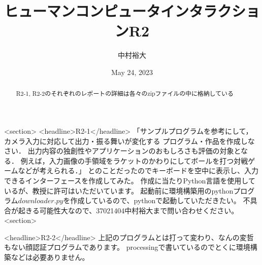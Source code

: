 \documentclass[titlepage]{jsarticle}
\title{ヒューマンコンピュータインタラクションR2}
\author{中村裕大}
\date{May 24, 2023}
\begin{document}
\maketitle

\begin{abstract}R2-1, R2-2のそれぞれのレポートの詳細は各々のzipファイルの中に格納している\end{abstract}
<section>
<headline>R2-1</headline>
「サンプルプログラムを参考にして， カメラ入力に対応して出力・振る舞いが変化する プログラム・作品を作成しなさい． 出力内容の独創性やアプリケーションのおもしろさも評価の対象となる． 例えば，入力画像の手領域をラケットのかわりにしてボールを打つ対戦ゲームなどが考えられる．」
とのことだったのでキーボードを空中に表示し、入力できるインターフェースを作成してみた。
作成に当たりPython言語を使用しているが、教授に許可はいただいています。
起動前に環境構築用のpythonプログラム$downloader.py$を作成しているので、pythonで起動していただきたい。
不具合が起きる可能性大なので、37021404中村裕大まで問い合わせください。
<section>

<headline>R2-2</headline>
上記のプログラムとは打って変わり、なんの変哲もない顔認証プログラムであります。
processingで書いているのでとくに環境構築などは必要ありません。
\end{document}
